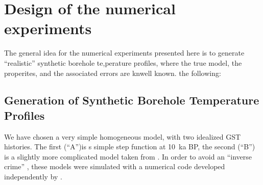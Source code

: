 \documentclass[cp]{copernicus}
\begin{document}
% 
% 
% 

\section{Design of the numerical experiments}
\label{sec:design}

The general idea for the numerical experiments presented here is to generate ``realistic'' 
synthetic borehole te,perature profiles, where the true model, the  properites, and the 
associated errors are knwell known. the following:

\subsection{Generation of Synthetic Borehole Temperature Profiles}
We have chosen a very simple homogeneous model, with two idealized GST histories. The first 
(``A'')is s simple step function at 10~ka BP, the second (``B'') is a slightly more complicated 
model taken from \cite{Balling1981a}. In order to avoid an ``inverse crime'' 
\cite[see][]{Kaipio2005a}, these models were simulated with a numerical code developed independently 
by \citet{Heckenbach2019a}.
\end{document}
